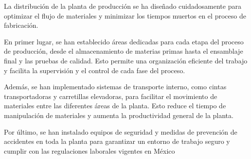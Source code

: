 La distribución de la planta de producción se ha diseñado cuidadosamente para optimizar el flujo de materiales y minimizar los tiempos muertos en el proceso de fabricación.

En primer lugar, se han establecido áreas dedicadas para cada etapa del proceso de producción, desde el almacenamiento de materias primas hasta el ensamblaje final y las pruebas de calidad. Esto permite una organización eficiente del trabajo y facilita la supervisión y el control de cada fase del proceso.

Además, se han implementado sistemas de transporte interno, como cintas transportadoras y carretillas elevadoras, para facilitar el movimiento de materiales entre las diferentes áreas de la planta. Esto reduce el tiempo de manipulación de materiales y aumenta la productividad general de la planta.

Por último, se han instalado equipos de seguridad y medidas de prevención de accidentes en toda la planta para garantizar un entorno de trabajo seguro y cumplir con las regulaciones laborales vigentes en México




